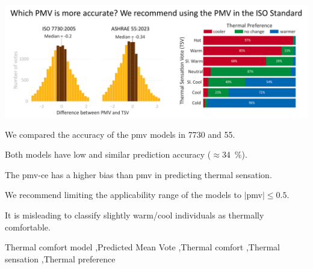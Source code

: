 \begin{frontmatter}
    \begin{graphicalabstract}
        \includegraphics[width=\linewidth]{figures/graphical_abstract}
    \end{graphicalabstract}

    \begin{highlights}
        \item We compared the accuracy of the \ac{pmv} models in \gls{7730} and \gls{55}.
        \item Both models have low and similar prediction accuracy ($\approx$\qty{34}{\percent}).
        \item The \ac{pmv-ce} has a higher bias than \ac{pmv} in predicting thermal sensation.
        \item We recommend limiting the applicability range of the models to $\mid$\ac{pmv}$\mid \leq 0.5$.
        \item It is misleading to classify slightly warm/cool individuals as thermally comfortable.
    \end{highlights}

    \begin{keyword}
        Thermal comfort model \sep Predicted Mean Vote \sep Thermal comfort \sep Thermal sensation \sep Thermal preference
    \end{keyword}

\end{frontmatter}

